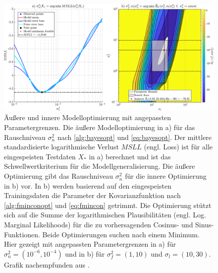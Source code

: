 \clearpage
\begin{figure}[tph]
	\centering
	\includegraphics[width=\linewidth]{chapters/images/4-EuOExp/QFCAPX-Z-N17-Bounds}
	\caption[Äußere und innere Modelloptimierung mit angepassten Parametergrenzen]{Äußere und innere Modelloptimierung mit angepassten Parametergrenzen. Die äußere Modelloptimierung in a) für das Rauschniveau $\sigma_n^2$ nach \autoref{alg:bayesopt} und \autoref{eq:bayesopt}. Der mittlere standardisierte logarithmische Verlust $MSLL$ (engl. Loss) ist für alle eingespeisten Testdaten $X_*$ in a) berechnet und ist das Schwellwertkriterium für die Modellgeneralisierung. Die äußere Optimierung gibt das Rauschniveau $\sigma_n^2$ für die innere Optimierung in b) vor. In b) werden basierend auf den eingespeisten Trainingsdaten die Parameter der Kovarianzfunktion nach \autoref{alg:fminconopt} und \autoref{eq:fmincon} getrimmt. Die Optimierung stützt sich auf die Summe der logarithmischen Plausibilitäten (engl. Log. Marginal Likelihoods) für die zu vorhersagenden Cosinus- und Sinus-Funktionen. Beide Optimierungen suchen nach einem Minimum. Hier gezeigt mit angepassten Parametergrenzen in a) für $\sigma_n^2 = (10^{-6}, 10^{-4})$ und in b) für $\sigma_f^2 = (1, 10)$ und $\sigma_l = (10, 30)$. Grafik nachempfunden aus \cite{Rasmussen2006}.}
	\label{fig:qfcapx-z-n17-bounds}
\end{figure}



